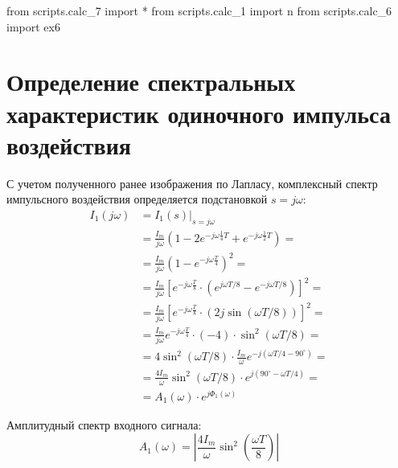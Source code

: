 \begin{python}
from scripts.calc_7 import *
from scripts.calc_1 import n
from scripts.calc_6 import ex6
\end{python}

\section{Определение спектральных характеристик одиночного импульса воздействия}
\label{sec:oprspechar}
С учетом полученного ранее изображения по Лапласу, комплексный спектр импульсного воздействия определяется подстановкой $s = j\omega$:
\begin{equation}
    \begin{aligned}
        I_1(j\omega)
            &= I_1(s) \Big|_{s=j\omega} \\
            &= \frac{I_m}{j\omega} \left(
                1 - 2e^{-j\omega \frac14 T} + e^{-j\omega \frac12 T}
            \right) = \\
            &=
                \frac{I_m}{j\omega} \left(
                    1 - e^{-j\omega\frac{T}4}
                \right)^2 = \\
            &=
                \frac{I_m}{j\omega} \left[
                    e^{-j\omega\frac{T}8} \cdot \left(
                        e^{j\omega T / 8} -
                        e^{-j\omega T / 8}
                    \right)
                \right]^2 = \\
            &=
                \frac{I_m}{j\omega} \left[
                    e^{-j\omega\frac{T}8} \cdot \left(
                        2j\sin(\omega T / 8)
                    \right)
                \right]^2 = \\
            &= \frac{I_m}{j\omega} e^{-j\omega\frac{T}4} \cdot (-4) \cdot \sin^2(\omega T / 8) = \\
            &= 4\sin^2(\omega T / 8) \cdot \frac{I_m}{\omega} e^{-j(\omega T/4 - 90^\circ)} = \\
            &= \frac{4I_m}{\omega} \sin^2(\omega T / 8) \cdot e^{j(90^\circ - \omega T/4)} = \\
            &= A_1(\omega)\cdot e^{j\Phi_1(\omega)}
    \end{aligned}
    \label{form:I1jw}
\end{equation}

Амплитудный спектр входного сигнала:
\begin{equation}
    A_1(\omega) = \left|
        \frac{4I_m}{\omega} \sin^2\left(\frac{\omega T}{8}\right)
    \right|
\end{equation}
 
